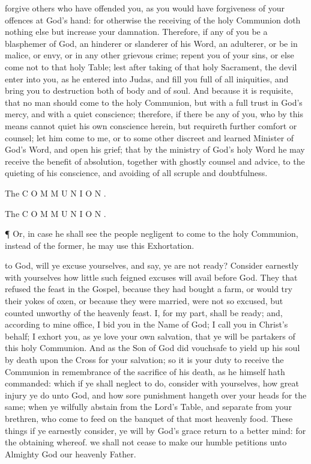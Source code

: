 forgive others who have offended you, as you would have forgiveness of your offences at God’s hand: for otherwise the receiving of the holy Communion doth nothing else but increase your damnation. Therefore, if any of you be a blasphemer of God, an hinderer or slanderer of his Word, an adulterer, or be in malice, or envy, or in any other grievous crime; repent you of your sins, or else come not to that holy Table; lest after taking of that holy Sacrament, the devil enter into you, as he entered into Judas, and fill you full of all iniquities, and bring you to destruction both of body and of soul. And because it is requisite, that no man should come to the holy Communion, but with a full trust in God’s mercy, and with a quiet conscience; therefore, if there be any of you, who by this means cannot quiet his own conscience herein, but requireth further comfort or counsel; let him come to me, or to some other discreet and learned Minister of God’s Word, and open his grief; that by the ministry of God’s holy Word he may receive the benefit of absolution, together with ghostly counsel and advice, to the quieting of his conscience, and avoiding of all scruple and doubtfulness.

The C O M M U N I O N .

The C O M M U N I O N .

¶ Or, in case he shall see the people negligent to come to the holy Communion, instead of the former, he may use this Exhortation.

to God, will ye excuse yourselves, and say, ye are not ready? Consider earnestly with yourselves how little such feigned excuses will avail before God. They that refused the feast in the Gospel, because they had bought a farm, or would try their yokes of oxen, or because they were married, were not so excused, but counted unworthy of the heavenly feast. I, for my part, shall be ready; and, according to mine office, I bid you in the Name of God; I call you in Christ’s behalf; I exhort you, as ye love your own salvation, that ye will be partakers of this holy Communion. And as the Son of God did vouchsafe to yield up his soul by death upon the Cross for your salvation; so it is your duty to receive the Communion in remembrance of the sacrifice of his death, as he himself hath commanded: which if ye shall neglect to do, consider with yourselves, how great injury ye do unto God, and how sore punishment hangeth over your heads for the same; when ye wilfully abstain from the Lord’s Table, and separate from your brethren, who come to feed on the banquet of that most heavenly food. These things if ye earnestly consider, ye will by God’s grace return to a better mind: for the obtaining whereof. we shall not cease to make our humble petitions unto Almighty God our heavenly Father.

